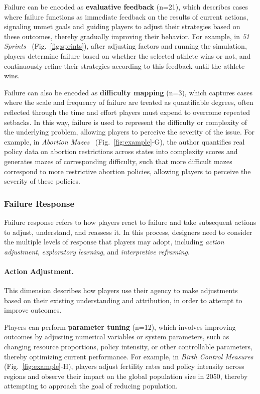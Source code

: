 Failure can be encoded as \textbf{evaluative feedback} (n=21), which describes cases where failure functions as immediate feedback on the results of current actions, signaling unmet goals and guiding players to adjust their strategies based on these outcomes, thereby gradually improving their behavior. For example, in \textit{51 Sprints}~\cite{51sprints} (Fig.~\ref{fig:sprints}), after adjusting factors and running the simulation, players determine failure based on whether the selected athlete wins or not, and continuously refine their strategies according to this feedback until the athlete wins.

Failure can also be encoded as \textbf{difficulty mapping} (n=3), which captures cases where the scale and frequency of failure are treated as quantifiable degrees, often reflected through the time and effort players must expend to overcome repeated setbacks. In this way, failure is used to represent the difficulty or complexity of the underlying problem, allowing players to perceive the severity of the issue. For example, in \textit{Abortion Mazes}~\cite{AbortionMazes} (Fig.~\ref{fig:example}-G), the author quantifies real policy data on abortion restrictions across states into complexity scores and generates mazes of corresponding difficulty, such that more difficult mazes correspond to more restrictive abortion policies, allowing players to perceive the severity of these policies.

\subsubsection{Failure Response}

Failure response refers to how players react to failure and take subsequent actions to adjust, understand, and reassess it. In this process, designers need to consider the multiple levels of response that players may adopt, including \textit{action adjustment}, \textit{exploratory learning}, and \textit{interpretive reframing}.

\paragraph{Action Adjustment.}
This dimension describes how players use their agency to make adjustments based on their existing understanding and attribution, in order to attempt to improve outcomes.

Players can perform \textbf{parameter tuning} (n=12), which involves improving outcomes by adjusting numerical variables or system parameters, such as changing resource proportions, policy intensity, or other controllable parameters, thereby optimizing current performance. For example, in \textit{Birth Control Measures}~\cite{BirthControlMeasures} (Fig.~\ref{fig:example}-H), players adjust fertility rates and policy intensity across regions and observe their impact on the global population size in 2050, thereby attempting to approach the goal of reducing population.

